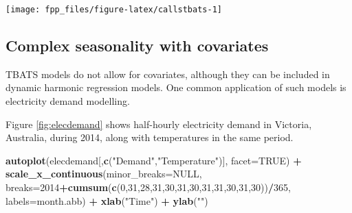 \documentclass[]{book}
\newenvironment{Shaded}{\begin{snugshade}}{\end{snugshade}}
\newcommand{\DataTypeTok}[1]{\textcolor[rgb]{0.13,0.29,0.53}{#1}}
\newcommand{\DecValTok}[1]{\textcolor[rgb]{0.00,0.00,0.81}{#1}}
\newcommand{\KeywordTok}[1]{\textcolor[rgb]{0.13,0.29,0.53}{\textbf{#1}}}
\newcommand{\NormalTok}[1]{#1}
\newcommand{\OperatorTok}[1]{\textcolor[rgb]{0.81,0.36,0.00}{\textbf{#1}}}
\newcommand{\OtherTok}[1]{\textcolor[rgb]{0.56,0.35,0.01}{#1}}
\newcommand{\StringTok}[1]{\textcolor[rgb]{0.31,0.60,0.02}{#1}}
\begin{document}
\begin{Shaded}
\end{Shaded}

\begin{center}\texttt{[image: fpp\_files/figure-latex/callstbats-1]} \end{center}

\hypertarget{complex-seasonality-with-covariates}{%
\subsection*{Complex seasonality with covariates}\label{complex-seasonality-with-covariates}}

TBATS models do not allow for covariates, although they can be included in dynamic harmonic regression models. One common application of such models is electricity demand modelling.

Figure \ref{fig:elecdemand} shows half-hourly electricity demand in Victoria, Australia, during 2014, along with temperatures in the same period.

\begin{Shaded}
\begin{Highlighting}[]
\KeywordTok{autoplot}\NormalTok{(elecdemand[,}\KeywordTok{c}\NormalTok{(}\StringTok{"Demand"}\NormalTok{,}\StringTok{"Temperature"}\NormalTok{)], }\DataTypeTok{facet=}\OtherTok{TRUE}\NormalTok{) }\OperatorTok{+}
\StringTok{  }\KeywordTok{scale_x_continuous}\NormalTok{(}\DataTypeTok{minor_breaks=}\OtherTok{NULL}\NormalTok{,}
    \DataTypeTok{breaks=}\DecValTok{2014}\OperatorTok{+}\KeywordTok{cumsum}\NormalTok{(}\KeywordTok{c}\NormalTok{(}\DecValTok{0}\NormalTok{,}\DecValTok{31}\NormalTok{,}\DecValTok{28}\NormalTok{,}\DecValTok{31}\NormalTok{,}\DecValTok{30}\NormalTok{,}\DecValTok{31}\NormalTok{,}\DecValTok{30}\NormalTok{,}\DecValTok{31}\NormalTok{,}\DecValTok{31}\NormalTok{,}\DecValTok{30}\NormalTok{,}\DecValTok{31}\NormalTok{,}\DecValTok{30}\NormalTok{))}\OperatorTok{/}\DecValTok{365}\NormalTok{,}
    \DataTypeTok{labels=}\NormalTok{month.abb) }\OperatorTok{+}
\StringTok{  }\KeywordTok{xlab}\NormalTok{(}\StringTok{"Time"}\NormalTok{) }\OperatorTok{+}\StringTok{ }\KeywordTok{ylab}\NormalTok{(}\StringTok{""}\NormalTok{)}
\end{Highlighting}
\end{Shaded}
\end{document}
